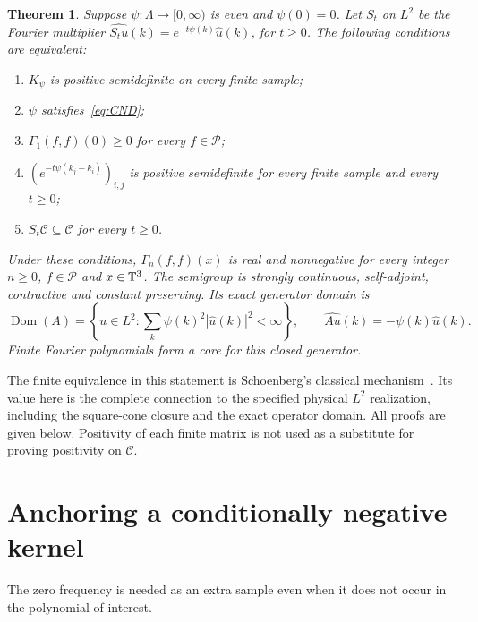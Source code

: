 \documentclass[11pt]{article}
\newtheorem{theorem}{Theorem}[section]
\theoremstyle{remark}\newtheorem{remark}[theorem]{Remark}
\DeclareMathOperator{\Dom}{Dom}
\begin{document}
\begin{theorem}\label{thm:main}
Suppose $\psi:\Lambda\to[0,\infty)$ is even and $\psi(0)=0$.
Let $S_t$ on $L^2$ be the Fourier multiplier
$\widehat{S_tu}(k)=e^{-t\psi(k)}\widehat u(k)$, for $t\geq0$.
The following conditions are equivalent:
\begin{enumerate}
\item $K_\psi$ is positive semidefinite on every finite sample;
\item $\psi$ satisfies~\eqref{eq:CND};
\item $\Gamma_1(f,f)(0)\geq0$ for every $f\in\mathcal P$;
\item $(e^{-t\psi(k_j-k_i)})_{i,j}$ is positive semidefinite
      for every finite sample and every $t\geq0$;
\item $S_t\mathcal C\subseteq\mathcal C$ for every $t\geq0$.
\end{enumerate}
Under these conditions, $\Gamma_n(f,f)(x)$ is real and
nonnegative for every integer $n\geq0$, $f\in\mathcal P$ and
$x\in\mathbb T^3$. The semigroup is strongly continuous, self-adjoint,
contractive and constant preserving. Its exact generator domain is
\begin{equation}\label{eq:domain}
 \Dom(A)=\left\{u\in L^2:
                  \sum_k\psi(k)^2|\widehat u(k)|^2<\infty\right\},
 \qquad\widehat{Au}(k)=-\psi(k)\widehat u(k).
\end{equation}
Finite Fourier polynomials form a core for this closed generator.
\end{theorem}

The finite equivalence in this statement is Schoenberg's
classical mechanism~\cite{schoenberg}. Its value here is the
complete connection to the specified physical $L^2$ realization,
including the square-cone closure and the exact operator domain.
All proofs are given below. Positivity of each finite matrix is
not used as a substitute for proving positivity on $\mathcal C$.

\section{Anchoring a conditionally negative kernel}
The zero frequency is needed as an extra sample even when it
does not occur in the polynomial of interest.
\end{document}
